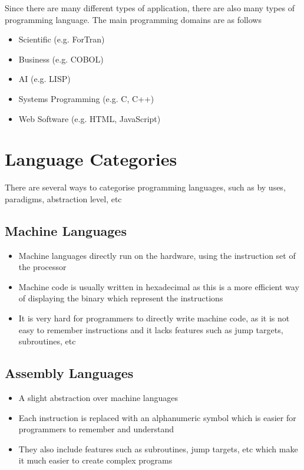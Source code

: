 
Since there are many different types of application, there are also many types of programming language.
 The main programming domains are as follows
\begin{itemize}
  \item Scientific (e.g. ForTran)
  \item Business (e.g. COBOL)
  \item AI (e.g. LISP)
  \item Systems Programming (e.g. C, C++)
  \item Web Software (e.g. HTML, JavaScript)
\end{itemize}

\section*{Language Categories}

There are several ways to categorise programming languages, such as by uses, paradigms, abstraction level, etc

\subsection*{Machine Languages}

\begin{itemize}
  \item Machine languages directly run on the hardware, using the instruction set of the processor
  \item Machine code is usually written in hexadecimal as this is a more efficient way of displaying the binary which
  represent the instructions
  \item It is very hard for programmers to directly write machine code, as it is not easy to remember instructions
  and it lacks features such as jump targets, subroutines, etc
\end{itemize}

\subsection*{Assembly Languages}

\begin{itemize}
  \item A slight abstraction over machine languages
  \item Each instruction is replaced with an alphanumeric symbol which is easier for programmers to remember and
   understand
  \item They also include features such as subroutines, jump targets, etc which make it much easier to create complex
  programs
\end{itemize}

